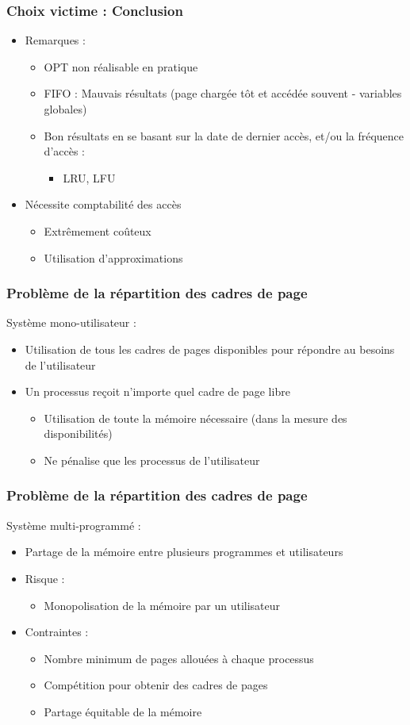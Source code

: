 \begin{frame}
\frametitle{Choix victime : Conclusion}
\begin{itemize}
\item Remarques :
\begin{itemize}
\item OPT non réalisable en pratique
\item FIFO : Mauvais résultats (page chargée tôt et accédée souvent - variables globales)
\item Bon résultats en se basant sur la date de dernier accès, et/ou la fréquence d'accès :
\begin{itemize}
\item LRU, LFU
\end{itemize}
\end{itemize}
\item Nécessite comptabilité des accès
\begin{itemize}
\item Extrêmement coûteux
\item Utilisation d'approximations
\end{itemize}
\end{itemize}
\end{frame}


\begin{frame}
\frametitle{Problème de la répartition des cadres de page}
Système mono-utilisateur :
\begin{itemize}
\item Utilisation de tous les cadres de pages disponibles pour répondre au besoins de l'utilisateur
\item Un processus reçoit n'importe quel cadre de page libre
\begin{itemize}
\item Utilisation de toute la mémoire nécessaire (dans la mesure des disponibilités)
\item Ne pénalise que les processus de l'utilisateur
\end{itemize}
\end{itemize}
\end{frame}


\begin{frame}
\frametitle{Problème de la répartition des cadres de page}
Système multi-programmé :
\begin{itemize}
\item Partage de la mémoire entre plusieurs programmes et utilisateurs
\item Risque :
\begin{itemize}
\item Monopolisation de la mémoire par un utilisateur
\end{itemize}
\item Contraintes :
\begin{itemize}
\item Nombre minimum de pages allouées à chaque processus
\item Compétition pour obtenir des cadres de pages
\item Partage équitable de la mémoire
\end{itemize}
\end{itemize}
\end{frame}


